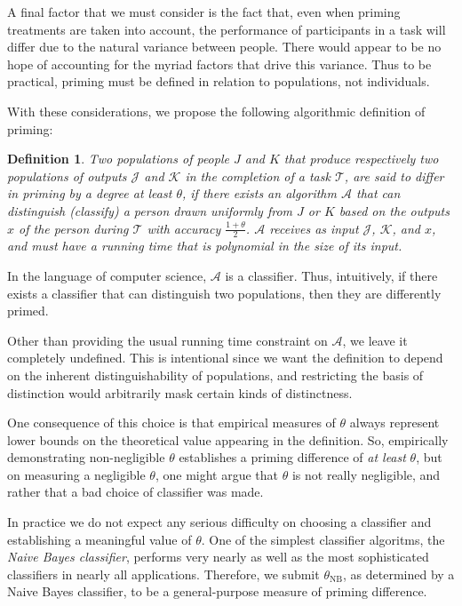 \documentclass[a4paper]{report}
\newtheorem*{mydef}{Definition}
\begin{document}
A final factor that we must consider is the fact that, even when priming 
treatments are taken into account, the performance of participants in a task 
will differ due to the natural variance between people.  There would appear to
be no hope of accounting for the myriad factors that drive this variance.  Thus
to be practical, priming must be defined in relation to populations, not
individuals.

With these considerations, we propose the following algorithmic definition of
priming:

\begin{mydef}
	Two populations of people $J$ and $K$ that produce respectively two 
	populations of outputs $\mathcal{J}$ and $\mathcal{K}$ in the completion
	of a task $\mathcal{T}$, are said to \emph{differ in priming by 
	a degree at least $\theta$}, if there exists an algorithm $\mathcal{A}$ 
	that can distinguish (classify)
	a person drawn uniformly from $J$ or $K$ based on the outputs $x$ of the 
	person during $\mathcal{T}$ with accuracy $\frac{1+\theta}{2}$.
	$\mathcal{A}$ receives as input $\mathcal{J}$, $\mathcal{K}$, and $x$,
	and must have a running time that is polynomial in the size of its input.
\end{mydef}

In the language of computer science, $\mathcal{A}$ is a classifier.  Thus,
intuitively, if there exists a classifier that can distinguish two populations,
then they are differently primed.

Other than providing the usual running time constraint on $\mathcal{A}$, we
leave it completely undefined.  This is intentional since we want the 
definition to depend on the inherent distinguishability of populations, and
restricting the basis of distinction would arbitrarily mask certain kinds of
distinctness.

One consequence of this choice is that empirical measures of $\theta$ always
represent lower bounds on the theoretical value appearing in the definition.
So, empirically demonstrating non-negligible $\theta$ establishes a priming 
difference of \textit{at least} $\theta$, but on measuring a negligible 
$\theta$, one might argue that $\theta$ is not really negligible, and rather 
that a bad choice of classifier was made.

In practice we do not expect any serious difficulty on choosing a classifier
and establishing a meaningful value of $\theta$.  One of the simplest 
classifier algoritms, the \textit{Naive Bayes classifier}, performs very 
nearly as well as the most sophisticated classifiers in nearly all 
applications.  Therefore, we submit $\theta_\text{NB}$, as determined by a 
Naive Bayes classifier, to be a general-purpose measure of priming difference.
\end{document}
